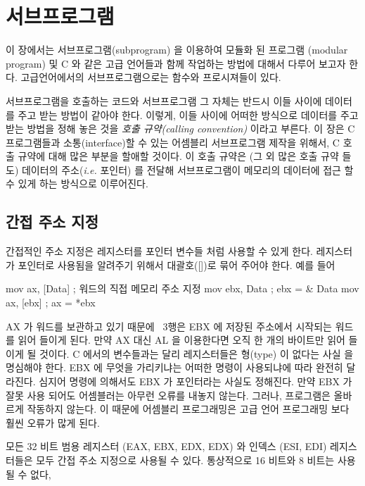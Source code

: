 ﻿%
\chapter{서브프로그램}

이 장에서는 서브프로그램(subprogram) 을 이용하여 모듈화 된 프로그램
(modular program) 및 C 와 같은 고급 언어들과 함께 작업하는 방법에 대해서
다루어 보고자 한다. 고급언어에서의 서브프로그램으로는 함수와 프로시져들이 있다. 

서브프로그램을 호출하는 코드와 서브프로그램 그 자체는 반드시 이들 
사이에 데이터를 주고 받는 방법이 같아야 한다. 이렇게, 이들 사이에 
어떠한 방식으로 데이터를 주고받는 방법을 정해 놓은 것을 \emph{호출 규약(calling convention)}
이라고 부른다. 이 장은 C 프로그램들과 소통(interface)할 수 있는 어셈블리
서브프로그램 제작을 위해서, C 호출 규약에 대해 많은 부분을 할애할 
것이다. 이 호출 규약은 (그 외 많은 호출 규약 들도) 데이터의 주소(\emph{i.e.} 포인터) 를 전달해
서브프로그램이 메모리의 데이터에 접근 할 수 있게 하는 방식으로 이루어진다. 

\section{간접 주소 지정}

간접적인 주소 지정은 레지스터를 포인터 변수들 처럼 사용할
수 있게 한다. 레지스터가 포인터로 사용됨을 알려주기 위해서 대괄호([])로 묶어
주어야 한다. 예를 들어 

\begin{AsmCodeListing}[frame=none]
      mov    ax, [Data]     ; 워드의 직접 메모리 주소 지정 
      mov    ebx, Data      ; ebx = & Data
      mov    ax, [ebx]      ; ax = *ebx
\end{AsmCodeListing}

AX 가 워드를 보관하고 있기 때문에 ~3행은 EBX 에 저장된 주소에서 시작되는 워드
를 읽어 들이게 된다. 만약 AX 대신 AL 을 이용한다면 오직 한 개의 바이트만 읽어
들이게 될 것이다. C 에서의 변수들과는 달리 레지스터들은 형(type) 이 없다는 사실
을 명심해야 한다. EBX 에 무엇을 가리키냐는 어떠한 명령이 사용되냐에 따라 완전히
달라진다. 심지어 명령에 의해서도 EBX 가 포인터라는
사실도 정해진다. 만약 EBX 가 잘못 사용 되어도 어셈블러는 아무런 오류를 내놓지 
않는다. 그러나, 프로그램은 올바르게 작동하지 않는다. 이 때문에 어셈블리 프로그래밍은
고급 언어 프로그래밍 보다 훨씬 오류가 많게 된다. 

모든 32 비트 범용 레지스터 (EAX, EBX, EDX, EDX) 와 인덱스 (ESI, EDI) 레지스터들은
모두 간접 주소 지정으로 사용될 수 있다. 통상적으로 16 비트와 8 비트는 사용될 수 없다, 


